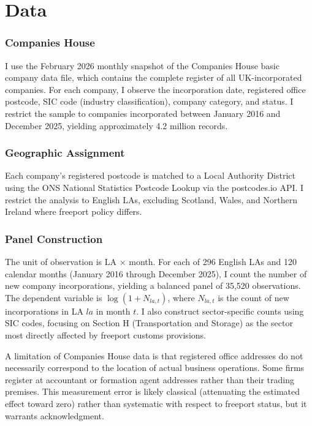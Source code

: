 \documentclass[12pt]{article}
\begin{document}
\section{Data}\label{sec:data}

\subsubsection*{Companies House} I use the February 2026 monthly snapshot of the Companies House basic company data file, which contains the complete register of all UK-incorporated companies. For each company, I observe the incorporation date, registered office postcode, SIC code (industry classification), company category, and status. I restrict the sample to companies incorporated between January 2016 and December 2025, yielding approximately 4.2 million records.

\subsubsection*{Geographic Assignment} Each company's registered postcode is matched to a Local Authority District using the ONS National Statistics Postcode Lookup via the postcodes.io API. I restrict the analysis to English LAs, excluding Scotland, Wales, and Northern Ireland where freeport policy differs.

\subsubsection*{Panel Construction} The unit of observation is LA $\times$ month. For each of 296 English LAs and 120 calendar months (January 2016 through December 2025), I count the number of new company incorporations, yielding a balanced panel of 35,520 observations. The dependent variable is $\log(1 + N_{la,t})$, where $N_{la,t}$ is the count of new incorporations in LA $la$ in month $t$. I also construct sector-specific counts using SIC codes, focusing on Section H (Transportation and Storage) as the sector most directly affected by freeport customs provisions.

A limitation of Companies House data is that registered office addresses do not necessarily correspond to the location of actual business operations. Some firms register at accountant or formation agent addresses rather than their trading premises. This measurement error is likely classical (attenuating the estimated effect toward zero) rather than systematic with respect to freeport status, but it warrants acknowledgment.
\end{document}
